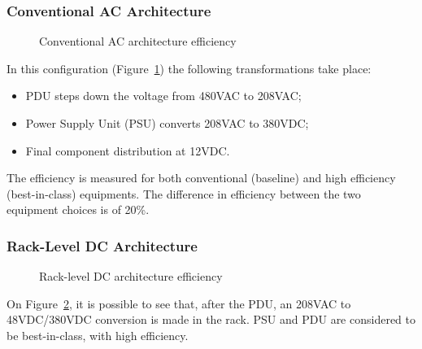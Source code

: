 {            \subsubsection*{Conventional AC Architecture}
                \begin{figure}[h!tb]
                    \centering
                    \caption{Conventional AC architecture efficiency}
                    \label{fig:conventional_ac_efficiency}
                \end{figure}
                In this configuration (Figure~\ref{fig:conventional_ac_efficiency}) the following transformations take place:
                \begin{itemize}
	                \item PDU steps down the voltage from 480VAC to 208VAC;
                    \item Power Supply Unit (PSU) converts 208VAC to 380VDC;
                    \item Final component distribution at 12VDC.
                \end{itemize}
                The efficiency is measured for both conventional (baseline) and high efficiency (best-in-class) equipments. The difference in efficiency between the two equipment choices is of 20\%.

            \subsubsection*{Rack-Level DC Architecture}
                \begin{figure}[h!tb]
                    \centering
                    \caption{Rack-level DC architecture efficiency}
                    \label{fig:rack_level_dc_efficiency}
                \end{figure}
                On Figure~\ref{fig:rack_level_dc_efficiency}, it is possible to see that, after the PDU, an 208VAC to 48VDC/380VDC conversion is made in the rack. PSU and PDU are considered to be best-in-class, with high efficiency.

}
